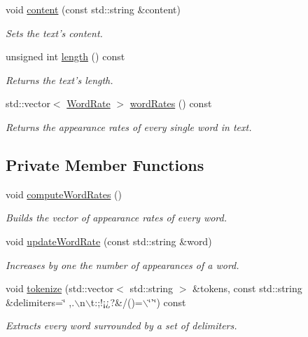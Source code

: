 \begin{CompactItemize}
void \hyperlink{class_text_eca454f28010b6b3e7bd0d771b8eaeb2}{content} (const std::string \&content)
\begin{CompactList}\small\item\em Sets the text's content. \item\end{CompactList}\item 
unsigned int \hyperlink{class_text_8d76db538f8617fb8880ba3e4ff3e6a5}{length} () const 
\begin{CompactList}\small\item\em Returns the text's length. \item\end{CompactList}\item 
std::vector$<$ \hyperlink{_word_rate_8hpp_8cfef8793106ac45a83059bd5573cbb3}{WordRate} $>$ \hyperlink{class_text_1387d9767b65f80355f1bdede26a0f7b}{wordRates} () const 
\begin{CompactList}\small\item\em Returns the appearance rates of every single word in text. \item\end{CompactList}\end{CompactItemize}
\subsection*{Private Member Functions}
\begin{CompactItemize}
\item 
void \hyperlink{class_text_8239e13039bcc1c713f66f1236693706}{computeWordRates} ()
\begin{CompactList}\small\item\em Builds the vector of appearance rates of every word. \item\end{CompactList}\item 
void \hyperlink{class_text_5ab8f9bfa566de537a167991fe10eff5}{updateWordRate} (const std::string \&word)
\begin{CompactList}\small\item\em Increases by one the number of appearances of a word. \item\end{CompactList}\item 
void \hyperlink{class_text_6b26c004c1cac61015f7d49c364a007d}{tokenize} (std::vector$<$ std::string $>$ \&tokens, const std::string \&delimiters=\char`\"{} ,.$\backslash$n$\backslash$t:;!¡¿?\&/()=$\backslash$\char`\"{}'\char`\"{}) const 
\begin{CompactList}\small\item\em Extracts every word surrounded by a set of delimiters. \item\end{CompactList}\end{CompactItemize}
